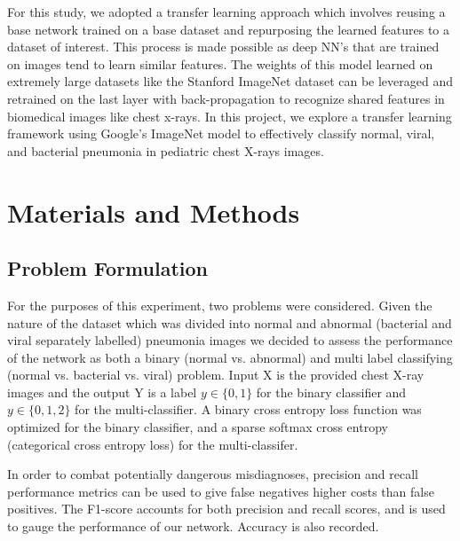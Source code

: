 \documentclass[conference]{IEEEtran}
\begin{document}
For this study, we adopted a transfer learning approach which involves reusing a base network trained on a base dataset and repurposing the learned features to a dataset of interest. This process is made possible as deep NN’s that are trained on images tend to learn similar features. The weights of this model learned on extremely large datasets like the Stanford ImageNet dataset can be leveraged and retrained on the last layer with back-propagation to recognize shared features in biomedical images like chest x-rays. In this project, we explore a transfer learning framework using Google’s ImageNet model to effectively classify normal, viral, and bacterial pneumonia in pediatric chest X-rays images.
\section{Materials and Methods}

\subsection{Problem Formulation}

For the purposes of this experiment, two problems were considered. Given the nature of the dataset which was divided into normal and abnormal (bacterial and viral separately labelled) pneumonia images we decided to assess the performance of the network as both a binary (normal vs. abnormal) and multi label classifying (normal vs. bacterial vs. viral) problem. Input X is the provided chest X-ray images and the output Y is a label $y\in\{0,1\}$ for the binary classifier and $y \in \{0,1,2\}$ for the multi-classifier. A binary cross entropy loss function was optimized for the binary classifier, and a sparse softmax cross entropy (categorical cross entropy loss) for the multi-classifer.

In order to combat potentially dangerous misdiagnoses, precision and recall performance metrics can be used to give false negatives higher costs than false positives. The F1-score accounts for both precision and recall scores, and is used to gauge the performance of our network. Accuracy is also recorded.
\end{document}
